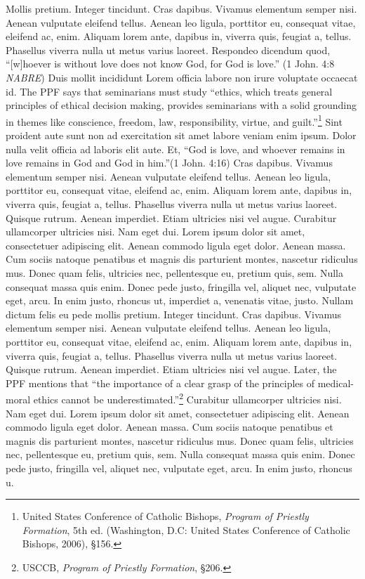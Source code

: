 \documentclass[
    12pt,
    letterpaper,
    oneside,
    noraggedright
]{turabian-researchpaper}
\begin{document}
Mollis pretium. Integer tincidunt. Cras dapibus. Vivamus elementum
semper nisi. Aenean vulputate eleifend tellus. Aenean leo ligula,
porttitor eu, consequat vitae, eleifend ac, enim. Aliquam lorem ante,
dapibus in, viverra quis, feugiat a, tellus. Phasellus viverra nulla ut
metus varius laoreet. Respondeo dicendum quod, ``{[}w{]}hoever is
without love does not know God, for God is love.'' (1 John. 4:8{
\emph{NABRE}}) Duis mollit incididunt Lorem officia labore non irure
voluptate occaecat id. The PPF says that seminarians must study
``ethics, which treats general principles of ethical decision making,
provides seminarians with a solid grounding in themes like conscience,
freedom, law, responsibility, virtue, and guilt.''\footnote{United
  States Conference of Catholic Bishops, \emph{Program of Priestly
  Formation}, 5th ed. (Washington, D.C: United States Conference of
  Catholic Bishops, 2006), §156.} Sint proident aute sunt non ad
exercitation sit amet labore veniam enim ipsum. Dolor nulla velit
officia ad laboris elit aute. Et, ``God is love, and whoever remains in
love remains in God and God in him.''(1 John. 4:16) Cras dapibus.
Vivamus elementum semper nisi. Aenean vulputate eleifend tellus. Aenean
leo ligula, porttitor eu, consequat vitae, eleifend ac, enim. Aliquam
lorem ante, dapibus in, viverra quis, feugiat a, tellus. Phasellus
viverra nulla ut metus varius laoreet. Quisque rutrum. Aenean imperdiet.
Etiam ultricies nisi vel augue. Curabitur ullamcorper ultricies nisi.
Nam eget dui. Lorem ipsum dolor sit amet, consectetuer adipiscing elit.
Aenean commodo ligula eget dolor. Aenean massa. Cum sociis natoque
penatibus et magnis dis parturient montes, nascetur ridiculus mus. Donec
quam felis, ultricies nec, pellentesque eu, pretium quis, sem. Nulla
consequat massa quis enim. Donec pede justo, fringilla vel, aliquet nec,
vulputate eget, arcu. In enim justo, rhoncus ut, imperdiet a, venenatis
vitae, justo. Nullam dictum felis eu pede mollis pretium. Integer
tincidunt. Cras dapibus. Vivamus elementum semper nisi. Aenean vulputate
eleifend tellus. Aenean leo ligula, porttitor eu, consequat vitae,
eleifend ac, enim. Aliquam lorem ante, dapibus in, viverra quis, feugiat
a, tellus. Phasellus viverra nulla ut metus varius laoreet. Quisque
rutrum. Aenean imperdiet. Etiam ultricies nisi vel augue. Later, the PPF
mentions that ``the importance of a clear grasp of the principles of
medical-moral ethics cannot be underestimated.''\footnote{USCCB, \emph{Program
  of Priestly Formation}, §206.} Curabitur ullamcorper ultricies nisi.
Nam eget dui. Lorem ipsum dolor sit amet, consectetuer adipiscing elit.
Aenean commodo ligula eget dolor. Aenean massa. Cum sociis natoque
penatibus et magnis dis parturient montes, nascetur ridiculus mus. Donec
quam felis, ultricies nec, pellentesque eu, pretium quis, sem. Nulla
consequat massa quis enim. Donec pede justo, fringilla vel, aliquet nec,
vulputate eget, arcu. In enim justo, rhoncus u.
\end{document}
